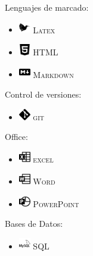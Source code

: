 \documentclass[a4paper,10pt]{article}
\begin{document}
\begin{minipage}[b]{\textwidth}
\begin{minipage}[b]{0.5 \textwidth}
Lenguajes de marcado:
\begin{itemize}
\item  \includegraphics[height=0.5cm, width=0.5cm]{img/latex.png} \textsc {Latex}
\item  \includegraphics[height=0.5cm, width=0.5cm]{img/html5.png} \textsc {HTML}
\item  \includegraphics[height=0.5cm, width=0.5cm]{img/markdown.png} \textsc {Markdown}
\end{itemize}
Control de versiones:
\begin{itemize}
\item \includegraphics[height=0.5cm, width=0.5cm]{img/git.png} \textsc {git}
\end{itemize} \end{minipage} \hfill
 \begin{minipage}[b]{0.5 \textwidth}
Office:
\begin{itemize}
\item  \includegraphics[height=0.5cm, width=0.5cm]{img/microsoftexcel.png} \textsc {excel}
\item  \includegraphics[height=0.5cm, width=0.5cm]{img/microsoftword.png} \textsc {Word} 
\item  \includegraphics[height=0.5cm, width=0.5cm]{img/microsoftpowerpoint.png} \textsc {PowerPoint}
\end{itemize}
Bases de Datos:
\begin{itemize}
\item \includegraphics[height=0.5cm, width=0.5cm]{img/mysql.png}  \textsc {SQL}
\end{itemize}
\end{minipage}\end{minipage}
\vfill
\newpage
\end{document}
